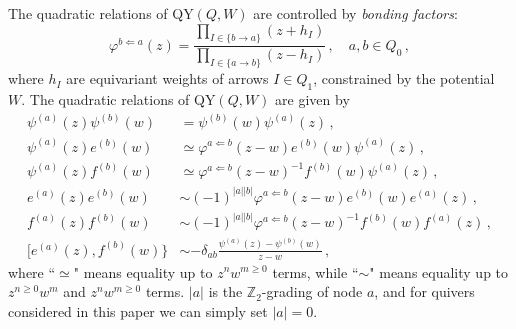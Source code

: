 \documentclass[12pt,a4paper]{article}
\begin{document}
\medskip 
The quadratic relations of QY$(Q,W)$ are controlled by \textit{bonding factors}:
\begin{equation}\label{eq:QY_bond}
	\varphi^{b\Leftarrow a}(z)=\frac{\prod_{I\in\{b\to a\}}(z+h_I)}{\prod_{I\in\{a\to b\}}(z-h_I)}\,, \quad a,b\in Q_0\,,
\end{equation}
where $h_I$ are equivariant weights of arrows $I\in Q_1$, constrained by the potential $W$. The quadratic relations of QY$(Q,W)$ are given by \cite{LiYamazaki2020,Li2024}
\begin{equation}\label{eq:QY_quadratic_relations}
	\begin{aligned}
		\psi^{(a)}(z)\psi^{(b)}(w)&=\psi^{(b)}(w)\psi^{(a)}(z)\,,\\
		\psi^{(a)}(z)e^{(b)}(w)&\simeq \varphi^{a\Leftarrow b}(z-w)e^{(b)}(w)\psi^{(a)}(z)\,,\\
		\psi^{(a)}(z)f^{(b)}(w)&\simeq \varphi^{a\Leftarrow b}(z-w)^{-1}f^{(b)}(w)\psi^{(a)}(z)\,,\\
		e^{(a)}(z)e^{(b)}(w)&\sim (-1)^{|a||b|}\varphi^{a\Leftarrow b}(z-w)e^{(b)}(w)e^{(a)}(z)\,,\\
		f^{(a)}(z)f^{(b)}(w)&\sim (-1)^{|a||b|}\varphi^{a\Leftarrow b}(z-w)^{-1}f^{(b)}(w)f^{(a)}(z)\,,\\
		[e^{(a)}(z), f^{(b)}(w)\}&\sim -\delta_{ab}\frac{\psi^{(a)}(z)-\psi^{(b)}(w)}{z-w}\,,
	\end{aligned}
\end{equation}
\noindent where ``$\simeq$" means equality up to $z^nw^{m\geq0}$ terms, while ``$\sim$" means equality up to $z^{n\geq 0}w^{m}$ and $z^nw^{m\geq0}$ terms. $|a|$ is the $\mathbb{Z}_2$-grading of node $a$, and for quivers considered in this paper we can simply set $|a|=0$.




\medskip
\end{document}
